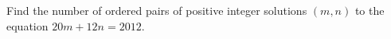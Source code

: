 Find the number of ordered pairs of positive integer solutions $(m,n)$ to the equation $20m+12n=2012.$
